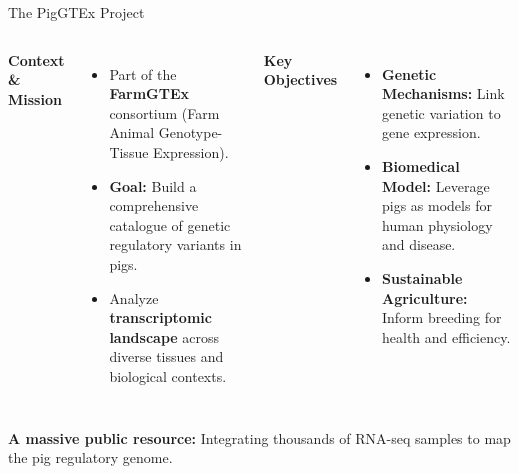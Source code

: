 \documentclass[aspectratio=169, 11pt, t]{beamer}
\newcommand{\cardiffHeading}[1]{\textcolor{CardiffBlack}{\fontsize{12}{15}\selectfont \textbf{#1}}}
\begin{document}
\begin{frame}{The PigGTEx Project}
    \vspace{0.2cm}
    \begin{columns}[T, onlytextwidth]
            \hspace{0.22cm}\cardiffHeading{Context \& Mission}
            \vspace{0.3em}
            \begin{itemize}
                \item Part of the \textbf{FarmGTEx} consortium (Farm Animal Genotype-Tissue Expression).
                \item \textbf{Goal:} Build a comprehensive catalogue of genetic regulatory variants in pigs.
                \item Analyze \textbf{transcriptomic landscape} across diverse tissues and biological contexts.
            \end{itemize}

            \cardiffHeading{Key Objectives}
            \vspace{0.3em}
            \begin{itemize}
                \item \textbf{Genetic Mechanisms:} Link genetic variation to gene expression.
                \item \textbf{Biomedical Model:} Leverage pigs as models for human physiology and disease.
                \item \textbf{Sustainable Agriculture:} Inform breeding for health and efficiency.
            \end{itemize}
    \end{columns}
    
    \vspace{0.2cm}
    \begin{center}
        {\footnotesize\color{CardiffDarkGrey}
        \textbf{A massive public resource:} Integrating thousands of RNA-seq samples to map the pig regulatory genome.}
    \end{center}
\end{frame}
\end{document}
